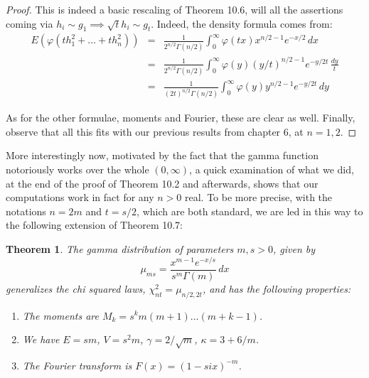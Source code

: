 \documentclass[12pt]{amsbook}
\newtheorem{theorem}{Theorem}[chapter]
\begin{document}
\begin{proof}
This is indeed a basic rescaling of Theorem 10.6, will all the assertions coming via $h_i\sim g_1\implies\sqrt{t}h_i\sim g_t$. Indeed, the density formula comes from:
\begin{eqnarray*}
E(\varphi(th_1^2+\ldots+th_n^2))
&=&\frac{1}{2^{n/2}\Gamma(n/2)}\int_0^\infty\varphi(tx)x^{n/2-1}e^{-x/2}\,dx\\
&=&\frac{1}{2^{n/2}\Gamma(n/2)}\int_0^\infty\varphi(y)(y/t)^{n/2-1}e^{-y/2t}\,\frac{dy}{t}\\
&=&\frac{1}{(2t)^{n/2}\Gamma(n/2)}\int_0^\infty\varphi(y)y^{n/2-1}e^{-y/2t}\,dy
\end{eqnarray*}

As for the other formulae, moments and Fourier, these are clear as well. Finally, observe that all this fits with our previous results from chapter 6, at $n=1,2$.
\end{proof}

More interestingly now, motivated by the fact that the gamma function notoriously works over the whole $(0,\infty)$, a quick examination of what we did, at the end of the proof of Theorem 10.2 and afterwards, shows that our computations work in fact for any $n>0$ real. To be more precise, with the notations $n=2m$ and $t=s/2$, which are both standard, we are led in this way to the following extension of Theorem 10.7:


\begin{theorem}
The gamma distribution of parameters $m,s>0$, given by
$$\mu_{ms}=\frac{x^{m-1}e^{-x/s}}{s^m\Gamma(m)}\,dx$$
generalizes the chi squared laws, $\chi^2_{nt}=\mu_{n/2,2t}$, and has the following properties: 
\begin{enumerate}
\item The moments are $M_k=s^km(m+1)\ldots(m+k-1)$.

\item We have $E=sm$, $V=s^2m$, $\gamma=2/\sqrt{m}$, $\kappa=3+6/m$.

\item The Fourier transform is $F(x)=(1-six)^{-m}$.
\end{enumerate}
\end{theorem}
\end{document}
